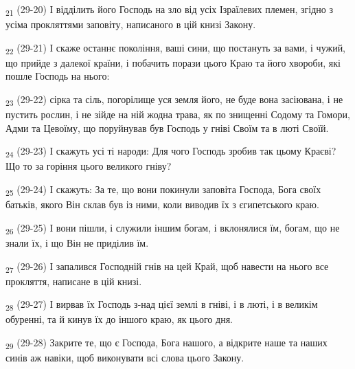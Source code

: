 \begin{tcolorbox}
\textsubscript{21} (29-20) І відділить його Господь на зло від усіх Ізраїлевих племен, згідно з усіма прокляттями заповіту, написаного в цій книзі Закону.
\end{tcolorbox}
\begin{tcolorbox}
\textsubscript{22} (29-21) І скаже останнє покоління, ваші сини, що постануть за вами, і чужий, що прийде з далекої країни, і побачить порази цього Краю та його хвороби, які пошле Господь на нього:
\end{tcolorbox}
\begin{tcolorbox}
\textsubscript{23} (29-22) сірка та сіль, погорілище уся земля його, не буде вона засіювана, і не пустить рослин, і не зійде на ній жодна трава, як по знищенні Содому та Гомори, Адми та Цевоїму, що поруйнував був Господь у гніві Своїм та в люті Своїй.
\end{tcolorbox}
\begin{tcolorbox}
\textsubscript{24} (29-23) І скажуть усі ті народи: Для чого Господь зробив так цьому Краєві? Що то за горіння цього великого гніву?
\end{tcolorbox}
\begin{tcolorbox}
\textsubscript{25} (29-24) І скажуть: За те, що вони покинули заповіта Господа, Бога своїх батьків, якого Він склав був із ними, коли виводив їх з єгипетського краю.
\end{tcolorbox}
\begin{tcolorbox}
\textsubscript{26} (29-25) І вони пішли, і служили іншим богам, і вклонялися їм, богам, що не знали їх, і що Він не приділив їм.
\end{tcolorbox}
\begin{tcolorbox}
\textsubscript{27} (29-26) І запалився Господній гнів на цей Край, щоб навести на нього все прокляття, написане в цій книзі.
\end{tcolorbox}
\begin{tcolorbox}
\textsubscript{28} (29-27) І вирвав їх Господь з-над цієї землі в гніві, і в люті, і в великім обуренні, та й кинув їх до іншого краю, як цього дня.
\end{tcolorbox}
\begin{tcolorbox}
\textsubscript{29} (29-28) Закрите те, що є Господа, Бога нашого, а відкрите наше та наших синів аж навіки, щоб виконувати всі слова цього Закону.
\end{tcolorbox}
